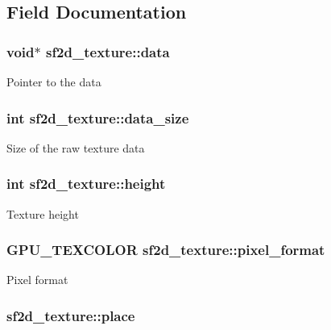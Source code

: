 \subsection{Field Documentation}
\hypertarget{structsf2d__texture_a46673c7ce439c63554a23e6ce83b254f}{
\subsubsection[{data}]{\setlength{\rightskip}{0pt plus 5cm}void$\ast$ sf2d\-\_\-texture\-::data}}\label{structsf2d__texture_a46673c7ce439c63554a23e6ce83b254f}
Pointer to the data \hypertarget{structsf2d__texture_a99107fa90e683bab6456da738ff9d005}{
\subsubsection[{data\-\_\-size}]{\setlength{\rightskip}{0pt plus 5cm}int sf2d\-\_\-texture\-::data\-\_\-size}}\label{structsf2d__texture_a99107fa90e683bab6456da738ff9d005}
Size of the raw texture data \hypertarget{structsf2d__texture_a055ccacd41038339dd1ded72747ccf8f}{
\subsubsection[{height}]{\setlength{\rightskip}{0pt plus 5cm}int sf2d\-\_\-texture\-::height}}\label{structsf2d__texture_a055ccacd41038339dd1ded72747ccf8f}
Texture height \hypertarget{structsf2d__texture_a247bd65d7ab9db17fdd8bd78b17cba23}{
\subsubsection[{pixel\-\_\-format}]{\setlength{\rightskip}{0pt plus 5cm}G\-P\-U\-\_\-\-T\-E\-X\-C\-O\-L\-O\-R sf2d\-\_\-texture\-::pixel\-\_\-format}}\label{structsf2d__texture_a247bd65d7ab9db17fdd8bd78b17cba23}
Pixel format \hypertarget{structsf2d__texture_ac30cfc2de337739d1a19858e4fdacaa4}{
\subsubsection[{place}]{ sf2d\-\_\-texture\-::place}}\label{structsf2d__texture_ac30cfc2de337739d1a19858e4fdacaa4}
